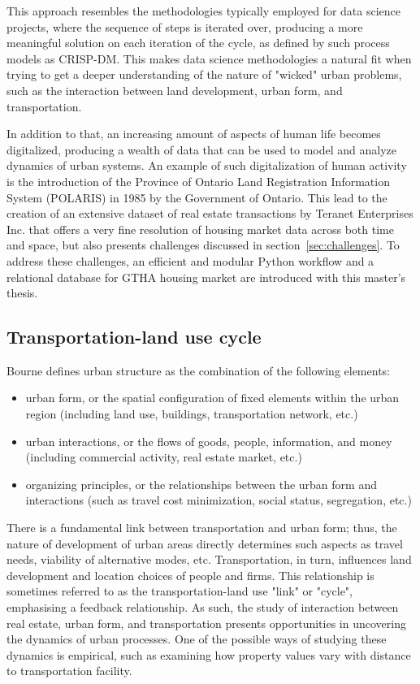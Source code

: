 This approach resembles the methodologies typically employed for data science projects, where the sequence of steps is iterated over, producing a more meaningful solution on each iteration of the cycle, as defined by such process models as CRISP-DM\cite{Shearer2000}.
This makes data science methodologies a natural fit when trying to get a deeper understanding of the nature of "wicked" urban problems, such as the interaction between land development, urban form, and transportation.

In addition to that, an increasing amount of aspects of human life becomes digitalized, producing a wealth of data that can be used to model and analyze dynamics of urban systems\cite{Arribas-Bel2014, Chen2016}.
An example of such digitalization of human activity is the introduction of the Province of Ontario Land Registration Information System (POLARIS) in 1985 by the Government of Ontario\cite{TeranetEnterprisesInc.}.
This lead to the creation of an extensive dataset of real estate transactions by Teranet Enterprises Inc.
that offers a very fine resolution of housing market data across both time and space, but also presents challenges discussed in section~\ref{sec:challenges}.
To address these challenges, an efficient and modular Python workflow and a relational database for GTHA housing market are introduced with this master's thesis.

\subsection{Transportation-land use cycle} \label{subsec:transportation_urban_form_real_estate_data}

Bourne\cite{Bourne1982} defines urban structure as the combination of the following elements:
\begin{itemize}
    \item urban form, or the spatial configuration of fixed elements within the urban region (including land use, buildings, transportation network, etc.)
    \item urban interactions, or the flows of goods, people, information, and money (including commercial activity, real estate market, etc.)
    \item organizing principles, or the relationships between the urban form and interactions (such as travel cost minimization, social status, segregation, etc.)
\end{itemize}
There is a fundamental link between transportation and urban form;
thus, the nature of development of urban areas directly determines such aspects as travel needs, viability of alternative modes, etc.
Transportation, in turn, influences land development and location choices of people and firms\cite{Miller1999}.
This relationship is sometimes referred to as the transportation-land use "link" or "cycle", emphasising a feedback relationship\cite{Kelly}.
As such, the study of interaction between real estate, urban form, and transportation presents opportunities in uncovering the dynamics of urban processes.
One of the possible ways of studying these dynamics is empirical, such as examining how property values vary with distance to transportation facility\cite{Sherry1999}.

